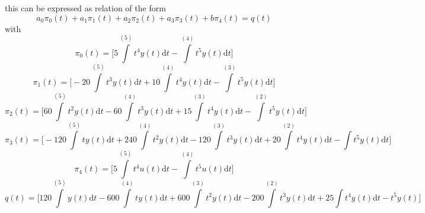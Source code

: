 \documentclass{article}
\begin{document}
this can be expressed as relation of the form
\begin{equation}
a_{0}\pi_{0}(t) + a_{1}\pi_{1}(t) + a_{2}\pi_{2}(t) + a_{3}\pi_{3}(t) + b\pi_{4}(t) = q(t)
\end{equation}
with
\begin{equation*}
\pi_{0}(t) = \bigg[5\int\limits^{(5)}t^4y(t) \mathrm{d}t - \int\limits^{(4)}t^5y(t)\mathrm{d}t\bigg]
\end{equation*}
\begin{equation*}
\pi_{1}(t) = \bigg[-20\int\limits^{(5)}t^3y(t) \mathrm{d}t + 10\int\limits^{(4)}t^4y(t)\mathrm{d}t - \int\limits^{(3)}t^5y(t)\mathrm{d}t\bigg]
\end{equation*}
\begin{equation*}
\pi_{2} (t) = \bigg[60\int\limits^{(5)}t^2y(t) \mathrm{d}t - 60\int\limits^{(4)}t^3y(t)\mathrm{d}t + 15\int\limits^{(3)}t^4y(t)\mathrm{d}t - \int\limits^{(2)} t^5y(t)\mathrm{d}t \bigg]
\end{equation*}
\begin{equation*}
\pi_{3}(t) = \bigg[-120\int\limits^{(5)}ty(t) \mathrm{d}t + 240\int\limits^{(4)}t^2y(t)\mathrm{d}t - 120\int\limits^{(3)}t^3y(t)\mathrm{d}t + 20\int\limits^{(2)}t^4y(t)\mathrm{d}t - \int t^5y(t)\mathrm{d}t \bigg]
\end{equation*}
\begin{equation*}
\pi_{4}(t) = \bigg[5 \int\limits^{(5)} t^4 u(t) \mathrm{d}t - \int\limits^{(4)} t^5 u(t) \mathrm{d}t \bigg]
\end{equation*}
\begin{equation*}
q(t) = \bigg[120\int\limits^{(5)}y(t) \mathrm{d}t - 600\int\limits^{(4)}ty(t)\mathrm{d}t + 600\int\limits^{(3)}t^2y(t)\mathrm{d}t - 200\int\limits^{(2)}t^3y(t)\mathrm{d}t + 25\int t^4y(t)\mathrm{d}t- t^5y(t) \bigg]
\end{equation*}
\end{document}
